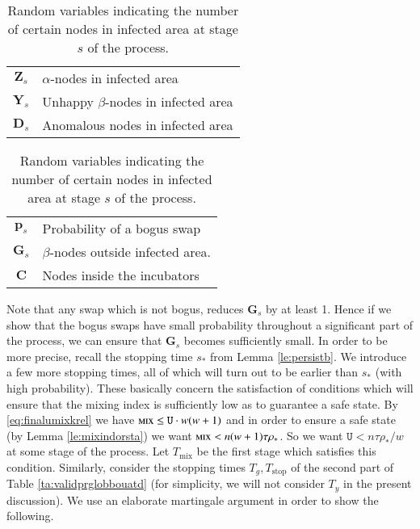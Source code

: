 \documentclass[11pt]{article}
\theoremstyle{plain}
\numberwithin{equation}{subsection}
\newcommand{\DD}{\mathbf{D}}
\newcommand{\GG}{\mathbf{G}}
\newcommand{\YY}{\mathbf{Y}}
\newcommand{\CC}{\mathbf{C}}
\newcommand{\pp}{\mathbf{p}}
\newcommand{\mix}{\textsc{mix}}
\begin{document}
\begin{table}\caption{Random variables indicating the number of certain nodes in 
infected area at stage $s$ of the 
process.}\label{ta:pranvarinfarfa2}
\colorbox{black!10}{ 
\begin{tabular}{cl}\toprule
{\bf\small $\mathbf{Z}_s$}  &   \textrm{\small $\alpha$-nodes in infected area}\\[1ex]
{\bf\small $\YY_s$}  &   \textrm{\small Unhappy $\beta$-nodes in infected area}\\[1ex]
{\bf\small $\DD_s$}  &   \textrm{\small Anomalous nodes in infected area}  \\[1ex]
\bottomrule \end{tabular} }
\quad
\colorbox{black!10}{ 
\begin{tabular}{cl}\toprule
{\bf\small $\pp_s$}  &   \textrm{\small Probability of a bogus swap}\\[1ex]
{\bf\small $\GG_s$}  &   \textrm{\small $\beta$-nodes outside infected area.}  \\[1ex]
{\bf\small $\CC$}     & \textrm{\small Nodes inside the incubators}\\[1ex]  
\bottomrule \end{tabular} } 
\centering
\end{table}

Note that any swap which is not bogus, reduces $\GG_s$ by at least 1. Hence if we show that the bogus swaps have
small probability throughout a significant part of the process, we can ensure that $\GG_s$ becomes sufficiently small.
In order to be more precise,
recall the stopping time $s_{\ast}$
from Lemma \ref{le:persistb}.
We introduce a few more stopping times, all of which 
will turn out to be earlier than $s_{\ast}$ (with high probability). These  
basically concern the satisfaction of conditions which will ensure that 
the mixing index is sufficiently low as to guarantee a safe state. 
By \eqref{eq:finalumixkrel} 
we have $\mix\leq \mathtt{U}\cdot w(w+1)$
and in order to ensure a safe state (by Lemma \ref{le:mixindorsta}) 
we want $\mix<n(w+1)\tau\rho_{\ast}$. 
So we want $\mathtt{U}<n\tau\rho_{\ast}/w$ at some stage of the process.
Let $T_{\textrm{mix}}$ be 
the first stage which satisfies this condition.
Similarly, consider the stopping times $T_g, T_{\textrm{stop}}$ of 
the second part of Table \ref{ta:validprglobbouatd} (for simplicity, we will not consider $T_y$ in the present discussion).
We use an elaborate martingale argument in order to show the following.
\end{document}
